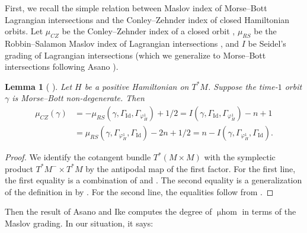 \documentclass[11pt]{amsart}
\numberwithin{equation}{section}
\theoremstyle{plain}
\newtheorem{Lemma}[lemma]{Lemma}
\theoremstyle{definition}
\theoremstyle{remark}
\newcommand{\Id}{{\operatorname{Id}}}
\newcommand\mhom{\operatorname{\mu hom}}
\begin{document}
First, we recall the simple relation between Maslov index of Morse--Bott Lagrangian intersections and the Conley--Zehnder index of closed Hamiltonian orbits. Let $\mu_{CZ}$ be the Conley--Zehnder index of a closed orbit \cite{RobbinSalamon}, $\mu_{RS}$ be the Robbin--Salamon Maslov index of Lagrangian intersections \cite{RobbinSalamon}, and $I$ be Seidel's grading of Lagrangian intersections \cite{Seidel-graded} (which we generalize to Morse--Bott intersections following Asano \cite[Appendix B.3]{Ike_2019}).

\begin{Lemma}[{\cite[Proposition 2.2]{CieliebakFloerHoferWysocki-application} \cite[Lemma 3.4]{Bourgeois-Oancea-automomous}}]
Let $H$ be a positive Hamiltonian on $T^*M$. Suppose the time-$1$ orbit $\gamma$ is Morse--Bott non-degenerate. Then 
\begin{align*}\mu_{CZ}(\gamma) &= -\mu_{RS}(\gamma, \Gamma_{\Id}, \Gamma_{\varphi_H^1}) + 1/2 = I(\gamma,\Gamma_{\Id}, \Gamma_{\varphi_H^1}) - n+1\\
&= \mu_{RS}(\gamma, \Gamma_{\varphi_H^1}, \Gamma_\Id) - 2n + 1/2=n - I(\gamma, \Gamma_{\varphi_H^1}, \Gamma_{\Id}).
\end{align*}
\end{Lemma}
\begin{proof}
We identify the cotangent bundle $T^*(M \times M)$ with the symplectic product $T^*M^- \times T^*M$ by the antipodal map of the first factor. For the first line, the first equality is a combination of \cite[Proposition 2.2]{CieliebakFloerHoferWysocki-application} and \cite[Lemma 3.4]{Bourgeois-Oancea-automomous}. The second equality is a generalization of the definition in \cite[Section 2d]{Seidel-graded} by \cite[Equation (B.9)]{Ike_2019}. For the second line, the equalities follow from \cite[Section 2d]{Seidel-graded}.
\end{proof}

Then the result of Asano and Ike \cite[Section 4 \& Appendix B]{Ike_2019} computes the degree of $\mhom$ in terms of the Maslov grading. In our situation, it says:
\end{document}

